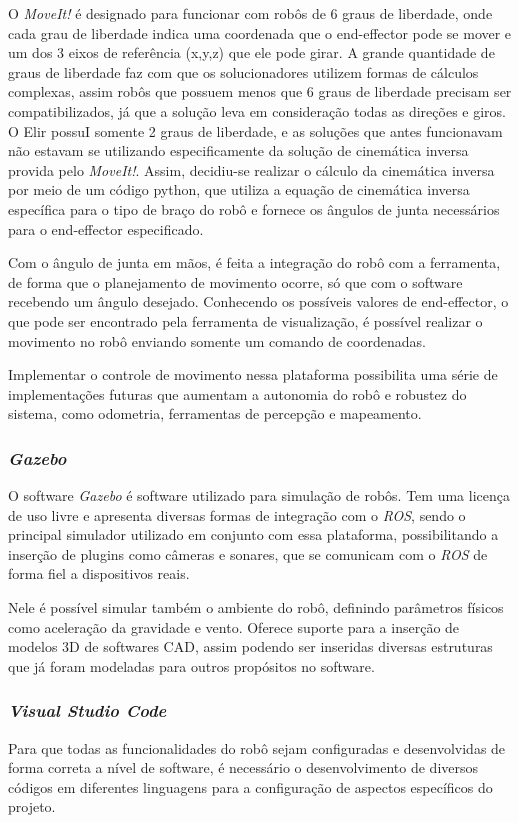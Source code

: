O \textit{MoveIt!} é designado para funcionar com robôs de 6 graus de liberdade, onde cada grau de liberdade indica uma coordenada que o end-effector pode se mover e um dos 3 eixos de referência (x,y,z) que ele pode girar. A grande quantidade de graus de liberdade faz com que os solucionadores utilizem formas de cálculos complexas, assim robôs que possuem menos que 6 graus de liberdade precisam ser compatibilizados, já que a solução leva em consideração todas as direções e giros. O Elir possuI somente 2 graus de liberdade, e as soluções que antes funcionavam não estavam se utilizando especificamente da solução de cinemática inversa provida pelo \textit{MoveIt!}. Assim, decidiu-se realizar o cálculo da cinemática inversa por meio de um código python, que utiliza a equação de cinemática inversa específica para o tipo de braço do robô e fornece os ângulos de junta necessários para o end-effector especificado. 

Com o ângulo de junta em mãos, é feita a integração do robô com a ferramenta, de forma que o planejamento de movimento ocorre, só que com o software recebendo um ângulo desejado. Conhecendo os possíveis valores de end-effector, o que pode ser encontrado pela ferramenta de visualização, é possível realizar o movimento no robô enviando somente um comando de coordenadas.

Implementar o controle de movimento nessa plataforma possibilita uma série de implementações futuras que aumentam a autonomia do robô e robustez do sistema, como odometria, ferramentas de percepção e mapeamento.

\subsubsection{\textit{Gazebo}}
O software \textit{Gazebo} é software utilizado para simulação de robôs. Tem uma licença de uso livre e apresenta diversas formas de integração com o \textit{ROS}, sendo o principal simulador utilizado em conjunto com essa plataforma, possibilitando a inserção de plugins como câmeras e sonares, que se comunicam com o \textit{ROS} de forma fiel a dispositivos reais.

Nele é possível simular também o ambiente do robô, definindo parâmetros físicos como aceleração da gravidade e vento. Oferece suporte para a inserção de modelos 3D de softwares CAD, assim podendo ser inseridas diversas estruturas que já foram modeladas para outros propósitos no software.

\subsubsection{\textit{Visual Studio Code}}
Para que todas as funcionalidades do robô sejam configuradas e desenvolvidas de forma correta a nível de software, é necessário o desenvolvimento de diversos códigos em diferentes linguagens para a configuração de aspectos específicos do projeto.

